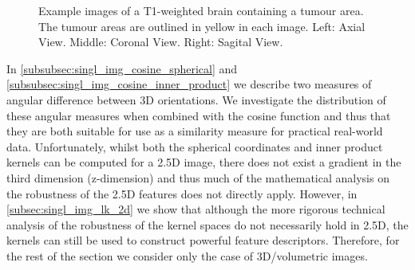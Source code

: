\begin{figure}
\begin{subfigure}{0.32\columnwidth}
    \end{subfigure}
    \caption{Example images of a T1-weighted brain containing a tumour area. 
             The tumour areas are outlined in yellow in each image.
             Left: Axial View. Middle: Coronal View. Right: Sagital View.}
\label{fig:singl_img_tumour_examples}
\end{figure}

In \cref{subsubsec:singl_img_cosine_spherical} and
\cref{subsubsec:singl_img_cosine_inner_product} we describe two measures of angular
difference between 3D orientations. We investigate the distribution of these
angular measures when combined with the cosine function and thus that they
are both suitable for use as a similarity measure for practical real-world data.
Unfortunately, whilst both the spherical coordinates and inner product kernels
can be computed for a 2.5D image,
there does not exist a gradient in the third dimension (z-dimension) and thus
much of the mathematical analysis on the robustness of the 2.5D features does 
not directly apply. However, in 
\cref{subsec:singl_img_lk_2d} we show that although the more rigorous technical
analysis of the robustness of the kernel spaces do not necessarily
hold in 2.5D, the kernels can still be used to construct
powerful feature descriptors. Therefore, for the rest of the section we consider
only the case of 3D/volumetric images.
